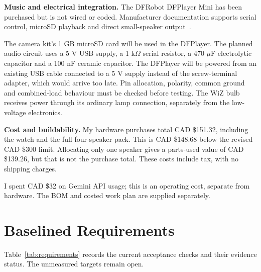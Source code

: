 \documentclass[conference,letterpaper]{IEEEtran}
\begin{document}
\textbf{Music and electrical integration.}
The DFRobot DFPlayer Mini has been purchased but is not wired or
coded. Manufacturer documentation supports serial control,
microSD playback and direct small-speaker output~\cite{dfplayer}.


The camera kit's 1 GB microSD card will be used in the DFPlayer.
The planned audio circuit uses a 5 V USB supply, a 1 k$\Omega$
serial resistor, a 470 $\mu$F electrolytic capacitor and a
100 nF ceramic capacitor. The DFPlayer will be powered from an
existing USB cable connected to a 5 V supply instead of the
screw-terminal adapter, which would arrive too late. Pin allocation, polarity, common
ground and combined-load behaviour must be checked before testing.
The WiZ bulb receives power through its ordinary lamp connection,
separately from the low-voltage electronics.

\textbf{Cost and buildability.}
My hardware purchases total CAD \$151.32, including the watch
and the full four-speaker pack. This is CAD \$148.68 below the
revised CAD \$300 limit. Allocating only one speaker gives a
parts-used value of CAD \$139.26, but that is not the purchase total.
These costs include tax, with no shipping charges.


I spent CAD \$32 on Gemini API usage; this is an operating cost,
separate from hardware. The BOM and costed work plan are supplied
separately.



\section{Baselined Requirements}
Table~\ref{tab:requirements} records the current acceptance checks and their evidence status. The unmeasured targets remain open.
\end{document}
